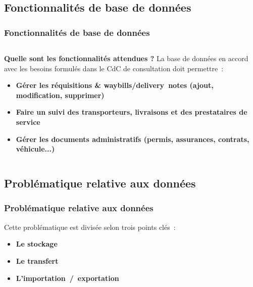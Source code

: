 \subsection[Fonctionnalités de base de données]{Fonctionnalités de base de données}
\begin{frame}
\frametitle{Fonctionnalités de base de données}
\begin{columns}[c]
\begin{column}{12cm}
\begin{block}{\textbf{Quelle sont les fonctionnalités attendues ?}}
La base de données en accord avec les besoins formulés dans le CdC de consultation doit permettre~:
\begin{itemize}
\item<2-> \textbf{Gérer les réquisitions \& waybills/delivery~notes (ajout, modification, supprimer)}
\item<3-> \textbf{Faire un suivi des transporteurs, livraisons et des prestataires de service}
\item<4-> \textbf{Gérer les documents administratifs (permis, assurances, contrats, véhicule...)}
\end{itemize}
\end{block}
\end{column}
\end{columns}
\end{frame}

\subsection[Problématique relative aux données]{Problématique relative aux données}
\begin{frame}
\frametitle{Problématique relative aux données}
Cette problématique est divisée selon trois points clés~:
\begin{itemize}
	\item<2-> \textbf{Le stockage}
	\item<3-> \textbf{Le transfert}
	\item<4-> \textbf{L'importation~/~exportation}
\end{itemize}
\end{frame}

